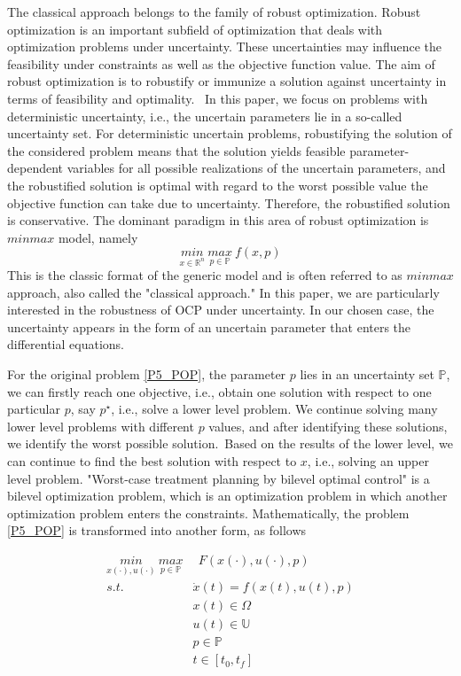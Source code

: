 \documentclass  [
  paper    = a4,
  BCOR     = 10mm,
  twoside,
  fontsize = 12pt,
  fleqn,
  toc      = bibnumbered,
  toc      = listofnumbered,
  numbers  = noendperiod,
  headings = normal,
  listof   = leveldown,
  version  = 3.03
]                                       {scrreprt}
\newcommand{\<}{\langle}
\renewcommand{\>}{\rangle}
\begin{document}
The classical approach belongs to the family of robust optimization. Robust optimization is an important subfield of optimization that deals with optimization problems under uncertainty. These uncertainties may influence the feasibility under constraints as well as the objective function value. The aim of robust optimization is to robustify or immunize a solution against uncertainty in terms of feasibility and optimality.  In this paper, we focus on problems with deterministic uncertainty, i.e., the uncertain parameters lie in a so-called uncertainty set. For deterministic uncertain problems, robustifying the solution of the considered problem means that the solution yields feasible parameter-dependent variables for all possible realizations of the uncertain parameters, and the robustified solution is optimal with regard to the worst possible value the objective function can take due to uncertainty. Therefore, the robustified solution is conservative. The dominant paradigm in this area of robust optimization is $minmax$ model, namely
\begin{equation}
	\underset{x \in \mathbb{R}^n}{min} \   \underset{p \in \mathbb{P}}{max}  \  f(x,p) 
\end{equation}
This is the classic format of the generic model and is often referred to as $minmax$ approach, also called the "classical approach." In this paper, we are particularly interested in the robustness of OCP under uncertainty. In our chosen case, the uncertainty appears in the form of an uncertain parameter that enters the differential equations.

For the original problem \ref{P5_POP}, the parameter $p$ lies in an uncertainty set $ \mathbb{P}$, we can firstly reach one objective, i.e., obtain one solution with respect to one particular $p$, say $p^\star$, i.e., solve a lower level problem. We continue solving many lower level problems with different $p$ values, and after identifying these solutions, we identify the worst possible solution. Based on the results of the lower level, we can continue to find the best solution with respect to $x$, i.e., solving an upper level problem. "Worst-case treatment planning by bilevel optimal control" is a bilevel optimization problem, which is an optimization problem in which another optimization problem enters the constraints. Mathematically, the problem \ref{P5_POP} is transformed into another form, as follows

\begin{equation}
	\begin{aligned}
		\underset{x(\cdot), u(\cdot)}{min} \   \underset{p  \in   \mathbb{P} }{max} & \ \ F(x(\cdot), u(\cdot), p)\\ 
	s.t.\ \   &  \dot{x} (t) = f(x(t), u(t), p)\\ 
& x(t) \in \Omega \\
& u(t) \in \mathbb{U}  \\
& p  \in   \mathbb{P}  \\
& t \in [t_0, t_f]
	\end{aligned}
	\label{minmax}
\end{equation}
\end{document}
